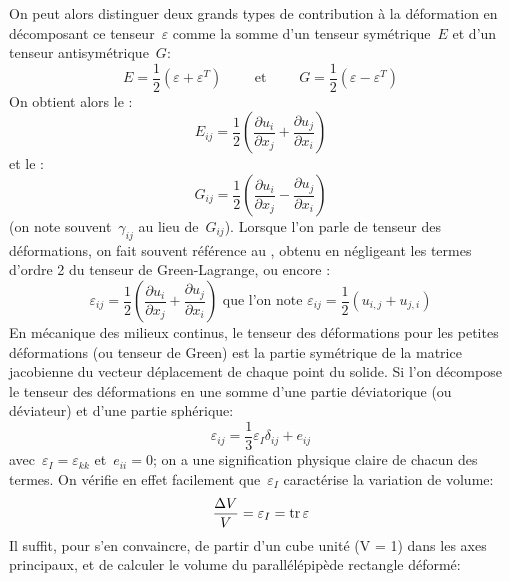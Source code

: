 \medskip
On peut alors distinguer deux grands types de contribution à la déformation en décomposant ce tenseur~$\varepsilon$ comme la somme d'un tenseur symétrique~$E$ et d'un tenseur antisymétrique~$G$:
\begin{equation} E=\frac12(\varepsilon+\varepsilon^T) \qquad \text{ et }\qquad G=\frac12(\varepsilon-\varepsilon^T) \end{equation}
On obtient alors le :
\begin{equation}E_{ij}=\frac12\left(\frac{\partial u_i}{\partial x_j}+\frac{\partial u_j}{\partial x_i}\right)\end{equation}
et le :
\begin{equation}G_{ij}=\frac12\left(\frac{\partial u_i}{\partial x_j}-\frac{\partial u_j}{\partial x_i}\right)\end{equation} (on note souvent~$\gamma_{ij}$ au lieu de~$G_{ij}$).
\medskipvm
Lorsque l'on parle de tenseur des déformations, on fait souvent référence au , obtenu en négligeant les termes d'ordre 2 du tenseur de Green-Lagrange, ou encore :
\begin{equation}
\varepsilon_{ij}=\frac12\left(\frac{\partial u_i}{\partial x_j}+\frac{\partial u_j}{\partial x_i}\right)
\text{ que l'on note }
\varepsilon_{ij}=\frac12(u_{i,j}+u_{j,i})
\end{equation}
\medskipvm
En mécanique des milieux continus, le tenseur des déformations pour les petites déformations (ou tenseur de Green) est la partie symétrique de la matrice jacobienne du vecteur déplacement de chaque point du solide.
\medskipvm
Si l'on décompose le tenseur des déformations en une somme d'une partie déviatorique (ou déviateur) et d'une partie sphérique:
\begin{equation} \varepsilon_{ij}=\frac13\varepsilon_I\delta_{ij}+e_{ij} \end{equation}
avec~$\varepsilon_I=\varepsilon_{kk}$ et~$e_{ii}=0$; on a une signification physique claire de chacun des termes. On vérifie en effet facilement que~$\varepsilon_I$ caractérise la variation de volume:
\begin{equation} \frac{\Delta V}V=\varepsilon_I=\operatorname{tr} \varepsilon \end{equation}
 Il suffit, pour s'en convaincre, de partir d'un cube unité (V = 1) dans les axes principaux, et de calculer le volume du parallélépipède rectangle déformé:

